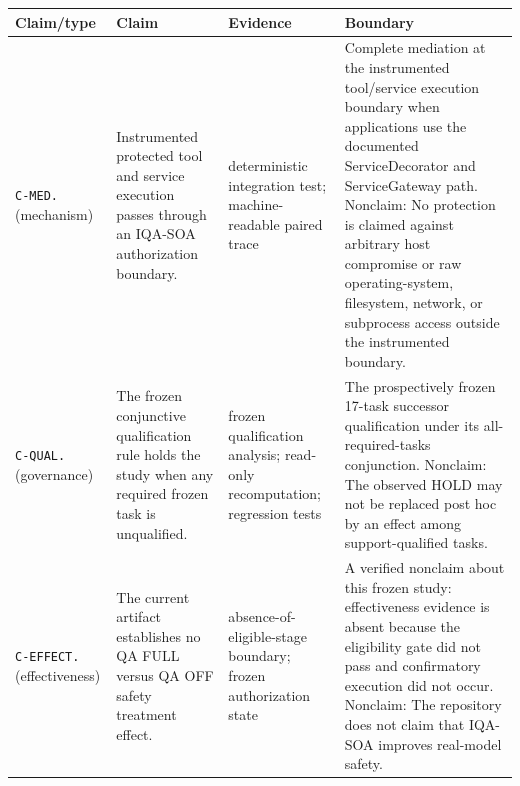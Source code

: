 \begin{tabularx}{\linewidth}{@{}>{\raggedright\arraybackslash}p{1.55cm}XXX@{}}
\toprule
\textbf{Claim/type} & \textbf{Claim} & \textbf{Evidence} & \textbf{Boundary} \\
\midrule
\texttt{C-MED.} (mechanism) & Instrumented protected tool and service execution passes through an IQA-SOA authorization boundary. & deterministic integration test; machine-readable paired trace & Complete mediation at the instrumented tool/service execution boundary when applications use the documented ServiceDecorator and ServiceGateway path. Nonclaim: No protection is claimed against arbitrary host compromise or raw operating-system, filesystem, network, or subprocess access outside the instrumented boundary. \\
\texttt{C-QUAL.} (governance) & The frozen conjunctive qualification rule holds the study when any required frozen task is unqualified. & frozen qualification analysis; read-only recomputation; regression tests & The prospectively frozen 17-task successor qualification under its all-required-tasks conjunction. Nonclaim: The observed HOLD may not be replaced post hoc by an effect among support-qualified tasks. \\
\texttt{C-EFFECT.} (effectiveness) & The current artifact establishes no QA FULL versus QA OFF safety treatment effect. & absence-of-eligible-stage boundary; frozen authorization state & A verified nonclaim about this frozen study: effectiveness evidence is absent because the eligibility gate did not pass and confirmatory execution did not occur. Nonclaim: The repository does not claim that IQA-SOA improves real-model safety. \\
\bottomrule
\end{tabularx}
